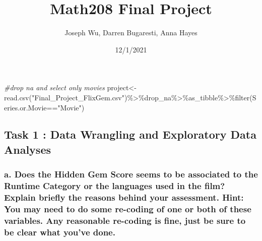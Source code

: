 \documentclass[
]{article}
\title{Math208 Final Project}
\author{Joseph Wu, Darren Bugaresti, Anna Hayes}
\date{12/1/2021}
\newenvironment{Shaded}{\begin{snugshade}}{\end{snugshade}}
\newcommand{\CommentTok}[1]{\textcolor[rgb]{0.56,0.35,0.01}{\textit{#1}}}
\newcommand{\FunctionTok}[1]{\textcolor[rgb]{0.00,0.00,0.00}{#1}}
\newcommand{\NormalTok}[1]{#1}
\newcommand{\OtherTok}[1]{\textcolor[rgb]{0.56,0.35,0.01}{#1}}
\newcommand{\SpecialCharTok}[1]{\textcolor[rgb]{0.00,0.00,0.00}{#1}}
\newcommand{\StringTok}[1]{\textcolor[rgb]{0.31,0.60,0.02}{#1}}
\begin{document}
\maketitle

\begin{Shaded}
\begin{Highlighting}[]
\CommentTok{\#drop na and select only movies}
\NormalTok{project}\OtherTok{\textless{}{-}}\FunctionTok{read.csv}\NormalTok{(}\StringTok{"Final\_Project\_FlixGem.csv"}\NormalTok{)}\SpecialCharTok{\%\textgreater{}\%}\NormalTok{drop\_na}\SpecialCharTok{\%\textgreater{}\%}\NormalTok{as\_tibble}\SpecialCharTok{\%\textgreater{}\%}\FunctionTok{filter}\NormalTok{(Series.or.Movie}\SpecialCharTok{==}\StringTok{"Movie"}\NormalTok{)}
\end{Highlighting}
\end{Shaded}

\hypertarget{task-1-data-wrangling-and-exploratory-data-analyses}{%
\subsection{\texorpdfstring{\textbf{Task 1} : Data Wrangling and
Exploratory Data
Analyses}{Task 1 : Data Wrangling and Exploratory Data Analyses}}\label{task-1-data-wrangling-and-exploratory-data-analyses}}

\hypertarget{a.-does-the-hidden-gem-score-seems-to-be-associated-to-the-runtime-category-or-the-languages-used-in-the-film-explain-briefly-the-reasons-behind-your-assessment.-hint-you-may-need-to-do-some-re-coding-of-one-or-both-of-these-variables.-any-reasonable-re-coding-is-fine-just-be-sure-to-be-clear-what-youve-done.}{%
\subsubsection{a. Does the Hidden Gem Score seems to be associated to
the Runtime Category or the languages used in the film? Explain briefly
the reasons behind your assessment. Hint: You may need to do some
re-coding of one or both of these variables. Any reasonable re-coding is
fine, just be sure to be clear what you've
done.}\label{a.-does-the-hidden-gem-score-seems-to-be-associated-to-the-runtime-category-or-the-languages-used-in-the-film-explain-briefly-the-reasons-behind-your-assessment.-hint-you-may-need-to-do-some-re-coding-of-one-or-both-of-these-variables.-any-reasonable-re-coding-is-fine-just-be-sure-to-be-clear-what-youve-done.}}
\end{document}
